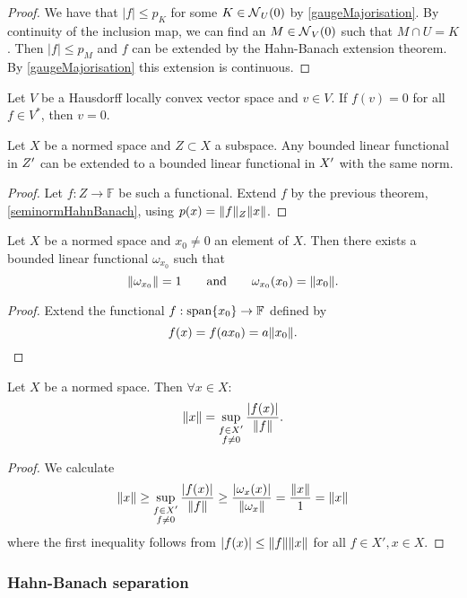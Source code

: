 \begin{proof}
We have that $|f|\leq p_K$ for some $K\in \operatorname{\mathcal{N}}_U(0)$ by \ref{gaugeMajorisation}. By continuity of the inclusion map, we can find an $M \in \operatorname{\mathcal{N}}_V(0)$ such that $M\cap U = K$. Then $|f|\leq p_M$ and $f$ can be extended by the Hahn-Banach extension theorem. By \ref{gaugeMajorisation} this extension is continuous.
\end{proof}
\begin{corollary}
Let $V$ be a Hausdorff locally convex vector space and $v\in V$. If $f(v) = 0$ for all $f\in V^*$, then $v = 0$.
\end{corollary}
\begin{corollary}
Let $X$ be a normed space and $Z\subset X$ a subspace. Any bounded linear functional in ${Z}^\prime$ can be extended to a bounded linear functional in ${X}^\prime$ with the same norm.
\end{corollary}
\begin{proof}
Let $f:Z\to \mathbb{F}$ be such a functional. Extend $f$ by the previous theorem, \ref{seminormHahnBanach}, using $p(x) = \lVert f\rVert_Z\lVert x\rVert$.
\end{proof}
\begin{corollary} \label{existenceBoundedFunctionalOfSameNorm}
Let $X$ be a normed space and $x_0\neq 0$ an element of $X$. Then there exists a bounded linear functional $\omega_{x_0}$ such that
\[ \lVert\omega_{x_0}\rVert = 1 \qquad \text{and} \qquad \omega_{x_0}(x_0)=\lVert x_0\rVert. \]
\end{corollary}
\begin{proof}
Extend the functional $f: \operatorname{span}\{x_0\}\to \mathbb{F}$ defined by
\[ f(x) = f(ax_0) = a\lVert x_0\rVert. \]
\end{proof}
\begin{corollary}
Let $X$ be a normed space. Then $\forall x\in X:$
\[ \lVert x\rVert = \sup_{\substack{f\in X' \\ f\neq 0}}\frac{|f(x)|}{\lVert f\rVert}. \]
\end{corollary}
\begin{proof}
We calculate
\[ \lVert x\rVert \geq \sup_{\substack{f\in X' \\ f\neq 0}}\frac{|f(x)|}{\lVert f\rVert} \geq \frac{|\omega_{x}(x)|}{\lVert\omega_{x}\rVert} = \frac{\lVert x\rVert}{1} = \lVert x\rVert \]
where the first inequality follows from $|f(x)|\leq \lVert f\rVert\lVert x\rVert$ for all $f\in X', x\in X$.
\end{proof}

\subsubsection{Hahn-Banach separation}

